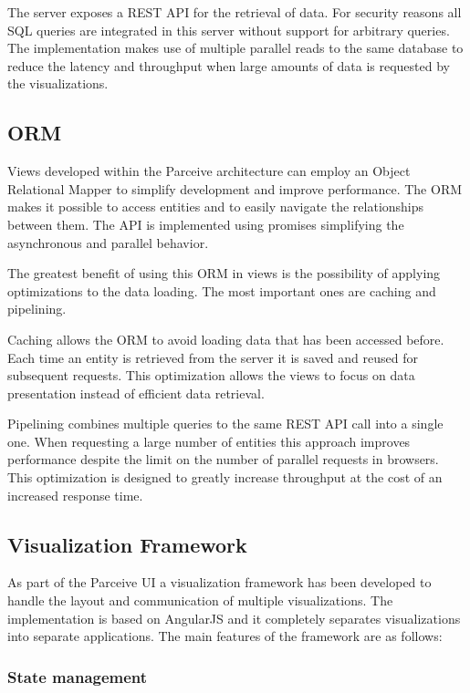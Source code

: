\documentclass[conference]{IEEEtran}
\begin{document}
The server exposes a REST \cite{rest} API for the retrieval of data. For security reasons all SQL queries are integrated in this server without support for arbitrary queries. The implementation makes use of multiple parallel reads to the same database to reduce the latency and throughput when large amounts of data is requested by the visualizations.

\subsection{ORM}

Views developed within the Parceive architecture can employ an Object Relational Mapper to simplify development and improve performance. The ORM makes it possible to access entities and to easily navigate the relationships between them. The API is implemented using promises \cite{promises} simplifying the asynchronous and parallel behavior.

The greatest benefit of using this ORM in views is the possibility of applying optimizations to the data loading. The most important ones are caching and pipelining.

Caching allows the ORM to avoid loading data that has been accessed before. Each time an entity is retrieved from the server it is saved and reused for subsequent requests. This optimization allows the views to focus on data presentation instead of efficient data retrieval.

Pipelining combines multiple queries to the same REST API call into a single one. When requesting a large number of entities this approach improves performance despite the limit on the number of parallel requests in browsers. This optimization is designed to greatly increase throughput at the cost of an increased response time.

\subsection{Visualization Framework}

As part of the Parceive UI a visualization framework has been developed to handle the layout and communication of multiple visualizations. The implementation is based on AngularJS and it completely separates visualizations into separate applications. The main features of the framework are as follows:

\subsubsection{State management}
\end{document}
